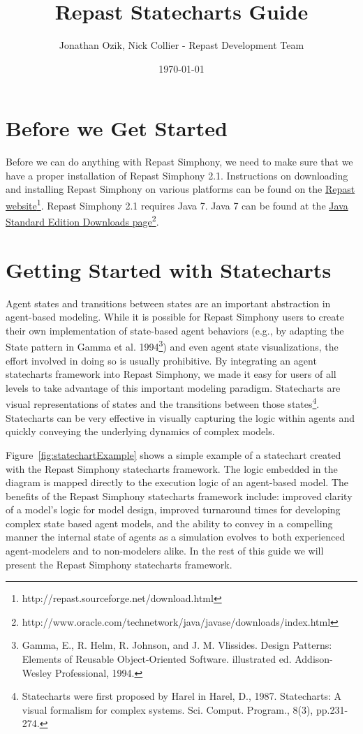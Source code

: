 \documentclass[11pt]{amsart}
\title{Repast Statecharts Guide}
\author{Jonathan Ozik, Nick Collier - Repast Development Team}
\date{\today}                                           %
\begin{document}
 
\maketitle
\setcounter{section}{-1}

\section{Before we Get Started}
Before we can do anything with Repast Simphony, we need to make sure that we have a proper installation of Repast Simphony 2.1. Instructions on downloading and installing Repast Simphony on various platforms can be found on the \href{http://repast.sourceforge.net/download.html}{Repast website}\footnote{http://repast.sourceforge.net/download.html}. Repast Simphony 2.1 requires Java 7. Java 7 can be found at the \href{http://www.oracle.com/technetwork/java/javase/downloads/index.html}{Java Standard Edition Downloads page}\footnote{http://www.oracle.com/technetwork/java/javase/downloads/index.html}.

\section{Getting Started with Statecharts}

Agent states and transitions between states are an important abstraction in agent-based modeling. While it is possible for Repast Simphony users to create their own implementation of state-based agent behaviors (e.g., by adapting the State pattern in Gamma et al. 1994\footnote{Gamma, E., R. Helm, R. Johnson, and J. M. Vlissides. Design Patterns: Elements of Reusable Object-Oriented Software. illustrated ed. Addison-Wesley Professional, 1994.}) and even agent state visualizations, the effort involved in doing so is usually prohibitive. By integrating an agent statecharts framework into Repast Simphony, we made it easy for users of all levels to take advantage of this important modeling paradigm. Statecharts are visual representations of states and the transitions between those states\footnote{Statecharts were first proposed by Harel in Harel, D., 1987. Statecharts: A visual formalism for complex systems. Sci. Comput. Program., 8(3), pp.231-274.}. Statecharts can be very effective in visually capturing the logic within agents and quickly conveying the underlying dynamics of complex models.

Figure~\ref{fig:statechartExample} shows a simple example of a statechart created with the Repast Simphony statecharts framework. The logic embedded in the diagram is mapped directly to the execution logic of an agent-based model. The benefits of the Repast Simphony statecharts framework include: improved clarity of a model's logic for model design, improved turnaround times for developing complex state based agent models, and the ability to convey in a compelling manner the internal state of agents as a simulation evolves to both experienced agent-modelers and to non-modelers alike. In the rest of this guide we will present the Repast Simphony statecharts framework.
\end{document}
